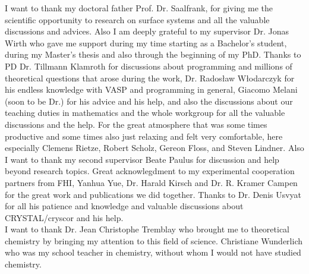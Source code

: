 \documentclass[11pt,DIV=13,BCOR=5mm,a4paper,headinclude]{scrbook}
\begin{document}
\begingroup
\renewcommand{\cleardoublepage}{}
\clearpage
{}
\endgroup
I want to thank my doctoral father Prof. Dr. Saalfrank, for giving me the scientific opportunity to research on surface systems and all the valuable discussions and advices.
Also I am deeply grateful to my supervisor Dr. Jonas Wirth who gave me support during my time starting as a Bachelor's student, during my Master's thesis and also through the beginning of my PhD.
Thanks to PD Dr. Tillmann Klamroth for discussions about programming and millions of theoretical questions that arose during the work, Dr. Rados\l{}aw W\l{}odarczyk for his endless knowledge with VASP and programming in general, Giacomo Melani (soon to be Dr.) for his advice and his help, and also the discussions about our teaching duties in mathematics and the whole workgroup for all the valuable discussions and the help.
For the great atmosphere that was some times productive and some times also just relaxing and felt very comfortable, here especially Clemens Rietze, Robert Scholz, Gereon Floss, and Steven Lindner.
Also I want to thank my second supervisor Beate Paulus for discussion and help beyond research topics.
Great acknowlegdment to my experimental cooperation partners from FHI, Yanhua Yue, Dr. Harald Kirsch and Dr. R.
Kramer Campen for the great work and publications we did together.
Thanks to Dr. Denis Usvyat for all his patience and knowledge and valuable discussions about CRYSTAL/cryscor and his help.\\
I want to thank Dr. Jean Christophe Tremblay who brought me to theoretical chemistry by bringing my attention to this field of science.
Christiane Wunderlich who was my school teacher in chemistry, without whom I would not have studied chemistry.

\end{document}
